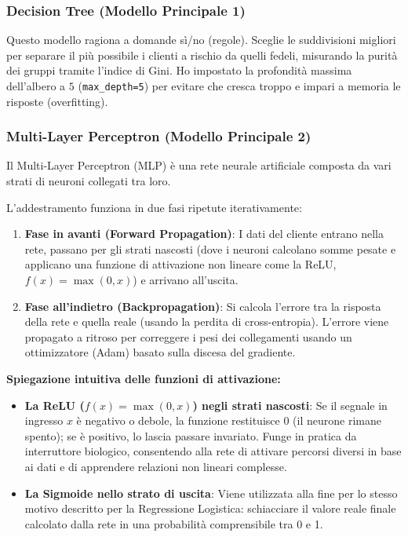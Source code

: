 \documentclass[a4paper,11pt]{article}
\begin{document}
\subsubsection{Decision Tree (Modello Principale 1)}
Questo modello ragiona a domande sì/no (regole). Sceglie le suddivisioni migliori per separare il più possibile i clienti a rischio da quelli fedeli, misurando la purità dei gruppi tramite l'indice di Gini. Ho impostato la profondità massima dell'albero a $5$ (\texttt{max\_depth=5}) per evitare che cresca troppo e impari a memoria le risposte (overfitting).

\subsubsection{Multi-Layer Perceptron (Modello Principale 2)}
Il Multi-Layer Perceptron (MLP) è una rete neurale artificiale composta da vari strati di neuroni collegati tra loro.

L'addestramento funziona in due fasi ripetute iterativamente:
\begin{enumerate}
    \item \textbf{Fase in avanti (Forward Propagation)}: I dati del cliente entrano nella rete, passano per gli strati nascosti (dove i neuroni calcolano somme pesate e applicano una funzione di attivazione non lineare come la ReLU, $f(x) = \max(0, x)$) e arrivano all'uscita.
    \item \textbf{Fase all'indietro (Backpropagation)}: Si calcola l'errore tra la risposta della rete e quella reale (usando la perdita di cross-entropia). L'errore viene propagato a ritroso per correggere i pesi dei collegamenti usando un ottimizzatore (Adam) basato sulla discesa del gradiente.
\end{enumerate}

\textbf{Spiegazione intuitiva delle funzioni di attivazione:}
\begin{itemize}
    \item \textbf{La ReLU ($f(x) = \max(0, x)$) negli strati nascosti}: Se il segnale in ingresso $x$ è negativo o debole, la funzione restituisce $0$ (il neurone rimane spento); se è positivo, lo lascia passare invariato. Funge in pratica da interruttore biologico, consentendo alla rete di attivare percorsi diversi in base ai dati e di apprendere relazioni non lineari complesse.
    \item \textbf{La Sigmoide nello strato di uscita}: Viene utilizzata alla fine per lo stesso motivo descritto per la Regressione Logistica: schiacciare il valore reale finale calcolato dalla rete in una probabilità comprensibile tra 0 e 1.
\end{itemize}
\end{document}
